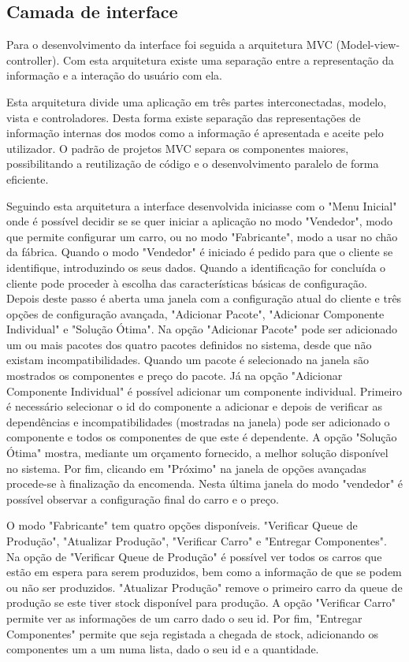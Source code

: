 \documentclass{llncs}
\newcommand\tab[1][0.5cm]{\hspace*{#1}}
\begin{document}
\subsection{Camada de interface}

Para o desenvolvimento da interface foi seguida a arquitetura MVC (Model-view-controller). Com esta arquitetura existe uma separação entre a representação da informação e a interação do usuário com ela.

\tab Esta arquitetura divide uma aplicação em três partes interconectadas, modelo, vista e controladores. Desta forma existe separação das representações de informação internas dos modos como a informação é apresentada e aceite pelo utilizador. O padrão de projetos MVC separa os componentes maiores, possibilitando a reutilização de código e o desenvolvimento paralelo de forma eficiente. 

\tab Seguindo esta arquitetura a interface desenvolvida iniciasse com o "Menu Inicial" onde é possível decidir se se quer iniciar a aplicação no modo "Vendedor", modo que permite configurar um carro, ou no modo "Fabricante", modo a usar no chão da fábrica.
Quando o modo "Vendedor" é iniciado é pedido para que o cliente se identifique, introduzindo os seus dados. Quando a identificação for concluída o cliente pode proceder à escolha das características básicas de configuração. Depois deste passo é aberta uma janela com a configuração atual do cliente e três opções de configuração avançada, "Adicionar Pacote", "Adicionar Componente Individual" e "Solução Ótima". Na opção "Adicionar Pacote" pode ser adicionado um ou mais pacotes dos quatro pacotes definidos no sistema, desde que não existam incompatibilidades. Quando um pacote é selecionado na janela são mostrados os componentes e preço do pacote. Já na opção "Adicionar Componente Individual" é possível adicionar um componente individual. Primeiro é necessário selecionar o id do componente a adicionar e depois de verificar as dependências e incompatibilidades (mostradas na janela) pode ser adicionado o componente e todos os componentes de que este é dependente. A opção "Solução Ótima" mostra, mediante um orçamento fornecido, a melhor solução disponível no sistema. Por fim, clicando em "Próximo" na janela de opções avançadas procede-se à finalização da encomenda. Nesta última janela do modo "vendedor" é possível observar a configuração final do carro e o preço.

\tab O modo "Fabricante" tem quatro opções disponíveis. "Verificar Queue de Produção", "Atualizar Produção", "Verificar Carro" e "Entregar Componentes". Na opção de "Verificar Queue de Produção" é possível ver todos os carros que estão em espera para serem produzidos, bem como a informação de que se podem ou não ser produzidos. "Atualizar Produção" remove o primeiro carro da queue de produção se este tiver stock disponível para produção. A opção "Verificar Carro" permite ver as informações de um carro dado o seu id. Por fim, "Entregar Componentes" permite que seja registada a chegada de stock, adicionando os componentes um a um numa lista, dado o seu id e a quantidade.
\end{document}
